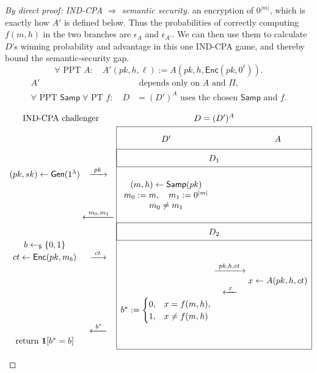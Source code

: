 \documentclass[12pt,a4paper]{article}
\begin{document}
\begin{proof}[By direct proof: IND-CPA $\Longrightarrow$ semantic security]
an encryption of $0^{|m|}$, which is exactly how $A'$ is defined below.
Thus the probabilities of correctly computing $f(m,h)$ in the two branches
are $\epsilon_A$ and $\epsilon_{A'}$. We can then use them to calculate
$D$'s winning probability and advantage in this one IND-CPA game,
and thereby bound the semantic-security gap.
\[
\forall\text{ PPT }A:\quad
A'(pk,h,\ell):=A(pk,h,\mathsf{Enc}(pk,0^\ell)).
\]
\[
\begin{aligned}
A'&\text{ depends only on }A\text{ and }\Pi,\\
\forall\text{ PPT }\mathsf{Samp}\;\forall\text{ PT }f:\quad
D&=(D')^A\text{ uses the chosen }\mathsf{Samp}\text{ and }f.
\end{aligned}
\]
\par\pagebreak[0]
\begin{samepage}
\begingroup\small
\[
\begin{array}{c@{\;}c@{\;}|c@{\;}c@{\;}c|}
\multicolumn{2}{c}{\text{IND-CPA challenger}}&\multicolumn{3}{c}{D=(D')^A}\\[3pt]
\cline{3-5}
&&\rule{0pt}{18pt}D'&&A\\[5pt]
\cline{3-5}
&&\multicolumn{3}{|c|}{\rule{0pt}{14pt}D_1}\\[3pt]
\cline{3-5}
(pk,sk)\leftarrow\mathsf{Gen}(1^\lambda)
&\xrightarrow{\ pk\ }&&&\\
&&(m,h)\leftarrow\mathsf{Samp}(pk)&&\\
&&m_0:=m,\quad m_1:=0^{|m|}&&\\
&&m_0\ne m_1&&\\
&\xleftarrow{\ m_0,m_1\ }&&&\\
\cline{3-5}
&&\multicolumn{3}{|c|}{\rule{0pt}{14pt}D_2}\\[3pt]
\cline{3-5}
b\leftarrow_{\$}\{0,1\}&&&&\\
ct\leftarrow\mathsf{Enc}(pk,m_b)
&\xrightarrow{\ ct\ }&&&\\
&&&\xrightarrow{\ pk,h,ct\ }&\\
&&&&x\leftarrow A(pk,h,ct)\\
&&&\xleftarrow{\ x\ }&\\
&&b^*:=\begin{cases}
0,&x=f(m,h),\\
1,&x\ne f(m,h)
\end{cases}&&\\
&\xleftarrow{\ b^*\ }&&&\\
\mathrm{return}\ \mathbf{1}[b^*=b]&&&&\\[3pt]
\cline{3-5}
\end{array}
\]
\endgroup

\end{samepage}
\end{proof}
\end{document}
